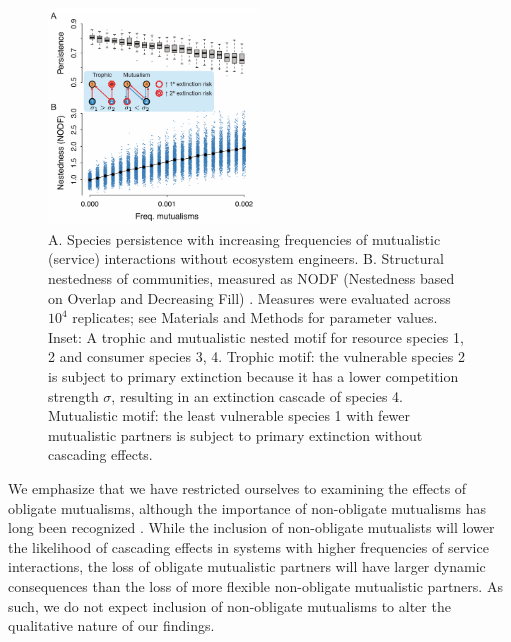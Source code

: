 \documentclass[9pt,twocolumn,twoside]{pnas-new}
\begin{document}
\begin{figure}[h!]
\centering
\includegraphics[width=0.5\textwidth]{fig_nested2.pdf}
\vspace{-8mm}
\caption{
A. Species persistence with increasing frequencies of mutualistic (service) interactions without ecosystem engineers.
B. Structural nestedness of communities, measured as NODF (Nestedness based on Overlap and Decreasing Fill) \cite{AlmeidaNeto2008}.
Measures were evaluated across $10^4$ replicates; see Materials and Methods for parameter values.
Inset: A trophic and mutualistic nested motif for resource species 1, 2 and consumer species 3, 4.
Trophic motif: the vulnerable species 2 is subject to primary extinction because it has a lower competition strength $\sigma$, resulting in an extinction cascade of species 4.
Mutualistic motif: the least vulnerable species 1 with fewer mutualistic partners is subject to primary extinction without cascading effects.
\vspace{-6mm}
}
\label{fig:nest}
\end{figure}


We emphasize that we have restricted ourselves to examining the effects of obligate mutualisms, although the importance of non-obligate mutualisms has long been recognized \cite{Ramos2012,Vieira2015,Valdovinos2016,Ponisio2017,Valdovinos2019}.
While the inclusion of non-obligate mutualists will lower the likelihood of cascading effects in systems with higher frequencies of service interactions, the loss of obligate mutualistic partners will have larger dynamic consequences than the loss of more flexible non-obligate mutualistic partners.
As such, we do not expect inclusion of non-obligate mutualisms to alter the qualitative nature of our findings.\\
\end{document}
